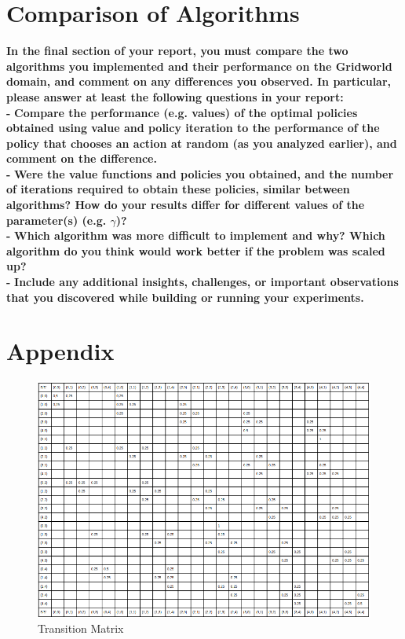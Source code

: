 \documentclass[11pt]{article}
\begin{document}
\newpage
\section{Comparison of Algorithms}
\textbf{In the final section of your report, you must compare the two algorithms you
implemented and their performance on the Gridworld domain, and comment on any
differences you observed. In particular, please answer at least the following
questions in your report:}
\\

\noindent
\textbf{-}
\noindent
\textbf{Compare the performance (e.g. values) of the optimal policies obtained
using value and policy iteration to the performance of the policy that chooses
an action at random (as you analyzed earlier), and comment on the difference.}
\\

\noindent
\textbf{-}
\noindent
\textbf{Were the value functions and policies you obtained, and the number of
iterations required to obtain these policies, similar between algorithms? How do
your results differ for different values of the parameter(s) (e.g. $\gamma$)?}
\\

\noindent
\textbf{-}
\noindent
\textbf{Which algorithm was more difficult to implement and why? Which algorithm
do you think would work better if the problem was scaled up?}
\\

\noindent
\textbf{-}
\noindent
\textbf{Include any additional insights, challenges, 
or important observations that you discovered while building or
 running your experiments.}
\\


\newpage
\section{Appendix}

\begin{figure}[h]
\includegraphics[scale=0.5]{transition_matrix}
\centering
\caption{Transition Matrix}
\end{figure}
\end{document}

